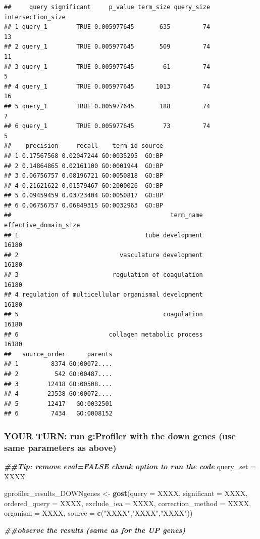 \documentclass[
]{book}
\newenvironment{Shaded}{\begin{snugshade}}{\end{snugshade}}
\newcommand{\AttributeTok}[1]{\textcolor[rgb]{0.13,0.29,0.53}{#1}}
\newcommand{\DocumentationTok}[1]{\textcolor[rgb]{0.56,0.35,0.01}{\textbf{\textit{#1}}}}
\newcommand{\FunctionTok}[1]{\textcolor[rgb]{0.13,0.29,0.53}{\textbf{#1}}}
\newcommand{\NormalTok}[1]{#1}
\newcommand{\OtherTok}[1]{\textcolor[rgb]{0.56,0.35,0.01}{#1}}
\newcommand{\StringTok}[1]{\textcolor[rgb]{0.31,0.60,0.02}{#1}}
\begin{document}
\begin{verbatim}
##     query significant     p_value term_size query_size intersection_size
## 1 query_1        TRUE 0.005977645       635         74                13
## 2 query_1        TRUE 0.005977645       509         74                11
## 3 query_1        TRUE 0.005977645        61         74                 5
## 4 query_1        TRUE 0.005977645      1013         74                16
## 5 query_1        TRUE 0.005977645       188         74                 7
## 6 query_1        TRUE 0.005977645        73         74                 5
##    precision     recall    term_id source
## 1 0.17567568 0.02047244 GO:0035295  GO:BP
## 2 0.14864865 0.02161100 GO:0001944  GO:BP
## 3 0.06756757 0.08196721 GO:0050818  GO:BP
## 4 0.21621622 0.01579467 GO:2000026  GO:BP
## 5 0.09459459 0.03723404 GO:0050817  GO:BP
## 6 0.06756757 0.06849315 GO:0032963  GO:BP
##                                            term_name effective_domain_size
## 1                                   tube development                 16180
## 2                            vasculature development                 16180
## 3                          regulation of coagulation                 16180
## 4 regulation of multicellular organismal development                 16180
## 5                                        coagulation                 16180
## 6                         collagen metabolic process                 16180
##   source_order      parents
## 1         8374 GO:00072....
## 2          542 GO:00487....
## 3        12418 GO:00508....
## 4        23538 GO:00072....
## 5        12417   GO:0032501
## 6         7434   GO:0008152
\end{verbatim}

\subsubsection{YOUR TURN: run g:Profiler with the down genes (use same parameters as above)}\label{your-turn-run-gprofiler-with-the-down-genes-use-same-parameters-as-above}

\begin{Shaded}
\begin{Highlighting}[]
\DocumentationTok{\#\#Tip: remove eval=FALSE chunk option to run the code}
\NormalTok{query\_set }\OtherTok{=}\NormalTok{ XXXX}

\NormalTok{gprofiler\_results\_DOWNgenes }\OtherTok{\textless{}{-}} \FunctionTok{gost}\NormalTok{(}\AttributeTok{query =}\NormalTok{ XXXX,}
                          \AttributeTok{significant =}\NormalTok{ XXXX,}
                          \AttributeTok{ordered\_query =}\NormalTok{ XXXX,}
                          \AttributeTok{exclude\_iea =}\NormalTok{ XXXX,}
                          \AttributeTok{correction\_method =}\NormalTok{ XXXX,}
                          \AttributeTok{organism =}\NormalTok{ XXXX,}
                          \AttributeTok{source =} \FunctionTok{c}\NormalTok{(}\StringTok{"XXXX"}\NormalTok{,}\StringTok{"XXXX"}\NormalTok{,}\StringTok{"XXXX"}\NormalTok{))}

\DocumentationTok{\#\#observe the results (same as for the UP genes)}
\end{Highlighting}
\end{Shaded}
\end{document}
